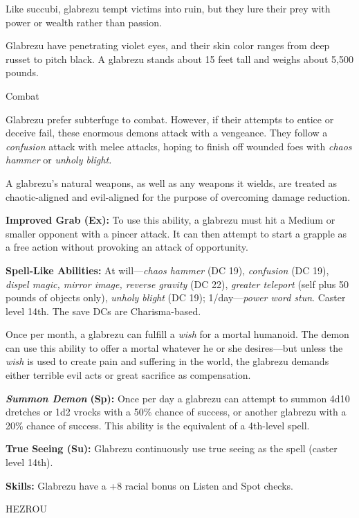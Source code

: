 \documentclass{article}
\begin{document}
Like succubi, glabrezu tempt victims into ruin, but they lure their prey with power 
or wealth rather than passion.

Glabrezu have penetrating violet eyes, and their skin color ranges from deep russet 
to pitch black. A glabrezu stands about 15 feet tall and weighs about 5,500 pounds.

Combat

Glabrezu prefer subterfuge to combat. However, if their attempts to entice or deceive 
fail, these enormous demons attack with a vengeance. They follow a \textit{confusion 
}attack with melee attacks, hoping to finish off wounded foes with \textit{chaos 
hammer }or \textit{unholy blight.}

A glabrezu's natural weapons, as well as any weapons it wields, are treated as 
chaotic-aligned and evil-aligned for the purpose of overcoming damage reduction.

\textbf{Improved Grab (Ex):} To use this ability, a glabrezu must hit a Medium 
or smaller opponent with a pincer attack. It can then attempt to start a grapple 
as a free action without provoking an attack of opportunity.

\textbf{Spell-Like Abilities:} At will---\textit{chaos hammer }(DC 19), \textit{confusion 
}(DC 19), \textit{dispel magic, mirror image, reverse gravity }(DC 22), \textit{greater 
teleport }(self plus 50 pounds of objects only), \textit{unholy blight }(DC 19); 
1/day---\textit{power word stun}. Caster level 14th. The save DCs are Charisma-based.

Once per month, a glabrezu can fulfill a \textit{wish }for a mortal humanoid. The 
demon can use this ability to offer a mortal whatever he or she desires---but unless 
the \textit{wish }is used to create pain and suffering in the world, the glabrezu 
demands either terrible evil acts or great sacrifice as compensation.

\textit{\textbf{Summon Demon }}\textbf{(Sp): }Once per day a glabrezu can attempt 
to summon 4d10 dretches or 1d2 vrocks with a 50\% chance of success, or another 
glabrezu with a 20\% chance of success. This ability is the equivalent of a 4th-level 
spell.

\textbf{True Seeing (Su): }Glabrezu continuously use true seeing as the spell (caster 
level 14th).

\textbf{Skills: }Glabrezu have a +8 racial bonus on Listen and Spot checks.

\vspace{12pt}
HEZROU
\end{document}
